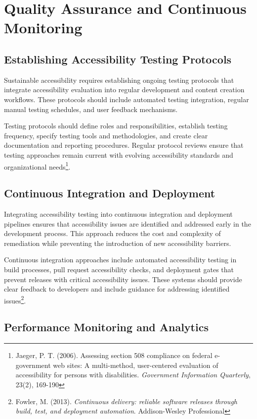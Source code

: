 \section{Quality Assurance and Continuous Monitoring}

\subsection{Establishing Accessibility Testing Protocols}

Sustainable accessibility requires establishing ongoing testing protocols that integrate accessibility evaluation into regular development and content creation workflows. These protocols should include automated testing integration, regular manual testing schedules, and user feedback mechanisms.

Testing protocols should define roles and responsibilities, establish testing frequency, specify testing tools and methodologies, and create clear documentation and reporting procedures. Regular protocol reviews ensure that testing approaches remain current with evolving accessibility standards and organizational needs\footnote{Jaeger, P. T. (2006). Assessing section 508 compliance on federal e-government web sites: A multi-method, user-centered evaluation of accessibility for persons with disabilities. \textit{Government Information Quarterly}, 23(2), 169-190}.

\subsection{Continuous Integration and Deployment}

Integrating accessibility testing into continuous integration and deployment pipelines ensures that accessibility issues are identified and addressed early in the development process. This approach reduces the cost and complexity of remediation while preventing the introduction of new accessibility barriers.

Continuous integration approaches include automated accessibility testing in build processes, pull request accessibility checks, and deployment gates that prevent releases with critical accessibility issues. These systems should provide clear feedback to developers and include guidance for addressing identified issues\footnote{Fowler, M. (2013). \textit{Continuous delivery: reliable software releases through build, test, and deployment automation}. Addison-Wesley Professional}.

\subsection{Performance Monitoring and Analytics}

